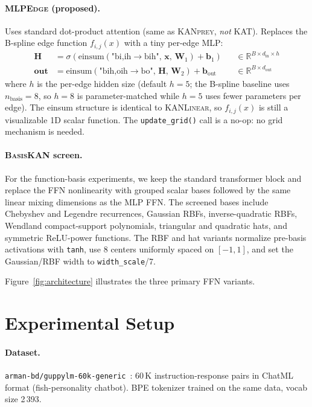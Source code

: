 \documentclass{article}
\newcommand{\fij}{f_{i,j}}
\newcommand{\mlpedge}{\textsc{MLPEdge}}
\newcommand{\kanprey}{\textsc{KANprey}}
\newcommand{\kanlinear}{\textsc{KANLinear}}
\newcommand{\basiskan}{\textsc{BasisKAN}}
\begin{document}
\paragraph{\mlpedge{} (proposed).}
Uses standard dot-product attention (same as \kanprey{}, \emph{not} KAT).
Replaces the B-spline edge function $\fij(x)$ with a tiny per-edge MLP:
\begin{align}
  \mathbf{H} &= \sigma\!\left(
    \text{einsum}(\text{"bi,ih}\to\text{bih"},\, \mathbf{x},\, \mathbf{W}_1)
    + \mathbf{b}_1\right)
    && \in \mathbb{R}^{B \times d_\text{in} \times h} \\
  \mathbf{out} &= \text{einsum}(\text{"bih,oih}\to\text{bo"},\,
    \mathbf{H},\, \mathbf{W}_2) + \mathbf{b}_\text{out}
    && \in \mathbb{R}^{B \times d_\text{out}}
\end{align}
where $h$ is the per-edge hidden size (default $h=5$; the B-spline baseline
uses $n_\text{basis}=8$, so $h=8$ is parameter-matched while $h=5$ uses
fewer parameters per edge). The einsum structure is identical to \kanlinear{}, so
$\fij(x)$ is still a visualizable 1D scalar function.
The \texttt{update\_grid()} call is a no-op: no grid mechanism is needed.

\paragraph{\basiskan{} screen.}
For the function-basis experiments, we keep the standard transformer block and
replace the FFN nonlinearity with grouped scalar bases followed by the same
linear mixing dimensions as the MLP FFN.
The screened bases include Chebyshev and Legendre recurrences, Gaussian RBFs,
inverse-quadratic RBFs, Wendland compact-support polynomials, triangular and
quadratic hats, and symmetric ReLU-power functions.
The RBF and hat variants normalize pre-basis activations with \texttt{tanh},
use 8 centers uniformly spaced on $[-1,1]$, and set the Gaussian/RBF width to
\texttt{width\_scale}/7.

Figure~\ref{fig:architecture} illustrates the three primary FFN variants.

\section{Experimental Setup}
\label{sec:setup}

\paragraph{Dataset.}
\texttt{arman-bd/guppylm-60k-generic}~\citep{guppylm60k}: 60\,K
instruction-response pairs in ChatML format (fish-personality chatbot).
BPE tokenizer trained on the same data, vocab size 2\,393.
\end{document}
